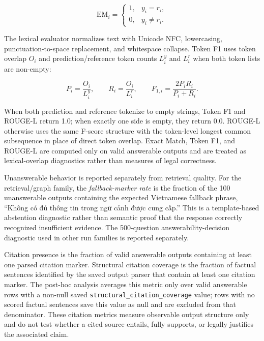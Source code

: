 \begin{equation}
\mathrm{EM}_i =
\begin{cases}
1, & y_i = r_i,\\
0, & y_i \neq r_i.
\end{cases}
\end{equation}

The lexical evaluator normalizes text with Unicode NFC, lowercasing, punctuation-to-space replacement, and whitespace collapse. Token F1 uses token overlap $O_i$ and prediction/reference token counts $L_i^y$ and $L_i^r$ when both token lists are non-empty:

\begin{equation}
P_i=\frac{O_i}{L_i^y},
\qquad
R_i=\frac{O_i}{L_i^r},
\qquad
F_{1,i}=\frac{2P_iR_i}{P_i+R_i}.
\end{equation}

When both prediction and reference tokenize to empty strings, Token F1 and ROUGE-L return 1.0; when exactly one side is empty, they return 0.0. ROUGE-L otherwise uses the same F-score structure with the token-level longest common subsequence in place of direct token overlap. Exact Match, Token F1, and ROUGE-L are computed only on valid answerable outputs and are treated as lexical-overlap diagnostics rather than measures of legal correctness.

Unanswerable behavior is reported separately from retrieval quality. For the retrieval/graph family, the \textit{fallback-marker rate} is the fraction of the 100 unanswerable outputs containing the expected Vietnamese fallback phrase, ``Không có đủ thông tin trong ngữ cảnh được cung cấp.'' This is a template-based abstention diagnostic rather than semantic proof that the response correctly recognized insufficient evidence. The 500-question answerability-decision diagnostic used in other run families is reported separately.

Citation presence is the fraction of valid answerable outputs containing at least one parsed citation marker. Structural citation coverage is the fraction of factual sentences identified by the saved output parser that contain at least one citation marker. The post-hoc analysis averages this metric only over valid answerable rows with a non-null saved \texttt{structural\_citation\_coverage} value; rows with no scored factual sentences save this value as null and are excluded from that denominator. These citation metrics measure observable output structure only and do not test whether a cited source entails, fully supports, or legally justifies the associated claim.

